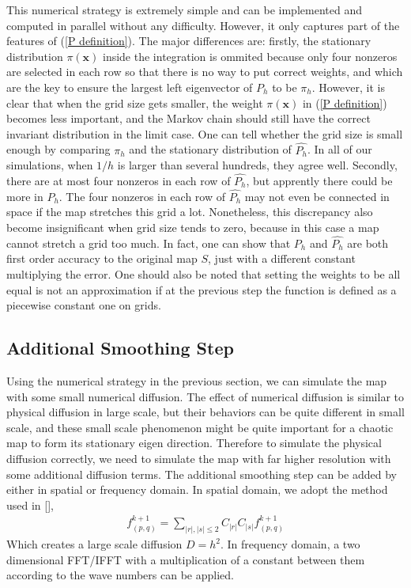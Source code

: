 \documentclass{article}
\begin{document}
This numerical strategy is extremely simple and can be implemented and computed in parallel without any difficulty. However, it only captures part of the features of (\ref{P definition}). The major differences are: firstly, the stationary distribution $\pi(\mathbf{x})$ inside the integration is ommited because only four nonzeros are selected in each row so that there is no way to put correct weights, and which are the key to ensure the largest left eigenvector of $P_h$ to be $\pi_h$. However, it is clear that when the grid size gets smaller, the weight $\pi(\mathbf{x})$ in (\ref{P definition}) becomes less important, and the Markov chain should still have the correct invariant distribution in the limit case. One can tell whether the grid size is small enough by comparing $\pi_h$ and the stationary distribution of $\hat{P_h}$. In all of our simulations, when $1/h$ is larger than several hundreds, they agree well. 
Secondly, there are at most four nonzeros in each row of $\hat{P_h}$, but apprently there could be more in $P_h$. The four nonzeros in each row of $\hat{P_h}$ may not even be connected in space if the map stretches this grid a lot. Nonetheless, this discrepancy also become insignificant when grid size tends to zero, because in this case a map cannot stretch a grid too much. In fact, one can show that $P_h$ and $\hat{P_h}$ are both first order accuracy to the original map $S$, just with a different constant multiplying the error. One should also be noted that setting the weights to be all equal is not an approximation if at the previous step the function is defined as a piecewise constant one on grids. 


\subsection{Additional Smoothing Step}
Using the numerical strategy in the previous section, we can simulate the map with some small numerical diffusion. The effect of numerical diffusion is similar to physical diffusion in large scale, but their behaviors can be quite different in small scale, and these small scale phenomenon might be quite important for a chaotic map to form its stationary eigen direction. Therefore to simulate the physical diffusion correctly, we need to simulate the map with far higher resolution with some additional diffusion terms. The additional smoothing step can be added by either in spatial or frequency domain. In spatial domain, we adopt the method used in [\cite{Tsang2005}], 
 \begin{eqnarray}
   f^{k+1}_{(p,q)} = \sum_{|r|,|s|\le 2}C_{|r|}C_{|s|}f^{k+1}_{(p,q)}
 \end{eqnarray}
Which creates a large scale diffusion $D=h^2$. In frequency domain, a two dimensional FFT/IFFT with a multiplication of a constant between them according to the wave numbers can be applied. 
\end{document}
